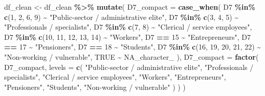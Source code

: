 \documentclass[
]{article}
\newenvironment{Shaded}{\begin{snugshade}}{\end{snugshade}}
\newcommand{\AttributeTok}[1]{\textcolor[rgb]{0.13,0.29,0.53}{#1}}
\newcommand{\ConstantTok}[1]{\textcolor[rgb]{0.56,0.35,0.01}{#1}}
\newcommand{\DecValTok}[1]{\textcolor[rgb]{0.00,0.00,0.81}{#1}}
\newcommand{\FunctionTok}[1]{\textcolor[rgb]{0.13,0.29,0.53}{\textbf{#1}}}
\newcommand{\NormalTok}[1]{#1}
\newcommand{\OtherTok}[1]{\textcolor[rgb]{0.56,0.35,0.01}{#1}}
\newcommand{\SpecialCharTok}[1]{\textcolor[rgb]{0.81,0.36,0.00}{\textbf{#1}}}
\newcommand{\StringTok}[1]{\textcolor[rgb]{0.31,0.60,0.02}{#1}}
\begin{document}
\begin{Shaded}
\begin{Highlighting}[]
\NormalTok{df\_clean }\OtherTok{\textless{}{-}}\NormalTok{ df\_clean }\SpecialCharTok{\%\textgreater{}\%}
  \FunctionTok{mutate}\NormalTok{(}
    \AttributeTok{D7\_compact =} \FunctionTok{case\_when}\NormalTok{(}
\NormalTok{      D7 }\SpecialCharTok{\%in\%} \FunctionTok{c}\NormalTok{(}\DecValTok{1}\NormalTok{, }\DecValTok{2}\NormalTok{, }\DecValTok{6}\NormalTok{, }\DecValTok{9}\NormalTok{) }\SpecialCharTok{\textasciitilde{}} \StringTok{"Public{-}sector / administrative elite"}\NormalTok{,}
\NormalTok{      D7 }\SpecialCharTok{\%in\%} \FunctionTok{c}\NormalTok{(}\DecValTok{3}\NormalTok{, }\DecValTok{4}\NormalTok{, }\DecValTok{5}\NormalTok{) }\SpecialCharTok{\textasciitilde{}} \StringTok{"Professionals / specialists"}\NormalTok{,}
\NormalTok{      D7 }\SpecialCharTok{\%in\%} \FunctionTok{c}\NormalTok{(}\DecValTok{7}\NormalTok{, }\DecValTok{8}\NormalTok{) }\SpecialCharTok{\textasciitilde{}} \StringTok{"Clerical / service employees"}\NormalTok{,}
\NormalTok{      D7 }\SpecialCharTok{\%in\%} \FunctionTok{c}\NormalTok{(}\DecValTok{10}\NormalTok{, }\DecValTok{11}\NormalTok{, }\DecValTok{12}\NormalTok{, }\DecValTok{13}\NormalTok{, }\DecValTok{14}\NormalTok{) }\SpecialCharTok{\textasciitilde{}} \StringTok{"Workers"}\NormalTok{,}
\NormalTok{      D7 }\SpecialCharTok{==} \DecValTok{15} \SpecialCharTok{\textasciitilde{}} \StringTok{"Entrepreneurs"}\NormalTok{,}
\NormalTok{      D7 }\SpecialCharTok{==} \DecValTok{17} \SpecialCharTok{\textasciitilde{}} \StringTok{"Pensioners"}\NormalTok{,}
\NormalTok{      D7 }\SpecialCharTok{==} \DecValTok{18} \SpecialCharTok{\textasciitilde{}} \StringTok{"Students"}\NormalTok{,}
\NormalTok{      D7 }\SpecialCharTok{\%in\%} \FunctionTok{c}\NormalTok{(}\DecValTok{16}\NormalTok{, }\DecValTok{19}\NormalTok{, }\DecValTok{20}\NormalTok{, }\DecValTok{21}\NormalTok{, }\DecValTok{22}\NormalTok{) }\SpecialCharTok{\textasciitilde{}} \StringTok{"Non{-}working / vulnerable"}\NormalTok{,}
      \ConstantTok{TRUE} \SpecialCharTok{\textasciitilde{}} \ConstantTok{NA\_character\_}
\NormalTok{    ),}
    \AttributeTok{D7\_compact =} \FunctionTok{factor}\NormalTok{(}
\NormalTok{      D7\_compact,}
      \AttributeTok{levels =} \FunctionTok{c}\NormalTok{(}
        \StringTok{"Public{-}sector / administrative elite"}\NormalTok{,}
        \StringTok{"Professionals / specialists"}\NormalTok{,}
        \StringTok{"Clerical / service employees"}\NormalTok{,}
        \StringTok{"Workers"}\NormalTok{,}
        \StringTok{"Entrepreneurs"}\NormalTok{,}
        \StringTok{"Pensioners"}\NormalTok{,}
        \StringTok{"Students"}\NormalTok{,}
        \StringTok{"Non{-}working / vulnerable"}
\NormalTok{      )}
\NormalTok{    )}
\NormalTok{  )}


\end{Highlighting}
\end{Shaded}
\end{document}
